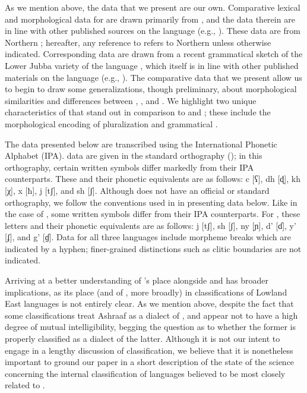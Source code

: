 \documentclass[output=paper]{LSP/langsci}
\begin{document}
 As we mention above, the  data that we present are our own. Comparative lexical and morphological data for  are drawn primarily from \citet{Greenetal2015}, and the data therein are in line with other published sources on the language (e.g., \citealt{Bell1953,Saeed1999}). These data are from Northern ; hereafter, any reference to  refers to Northern  unless otherwise indicated. Corresponding  data are drawn from a recent grammatical sketch of the Lower Jubba variety of the language \citet{PasterRanero2015}, which itself is in line with other published materials on the language (e.g., \citealt{Paster2007,Paster2010,PasterMaayGender}). The comparative data that we present allow us to begin to draw some generalizations, though preliminary, about morphological similarities and differences between , , and . We highlight two unique characteristics of  that stand out in comparison to  and ; these include the morphological encoding of pluralization and grammatical . 
 
 The  data presented below are transcribed using the International Phonetic Alphabet (IPA).  data are given in the standard  orthography (\citealt{Andrzejewski1978}); in this orthography, certain written symbols differ markedly from their IPA counterparts. These and their phonetic equivalents are as follows: c [ʕ], dh [ɖ], kh [χ], x [ħ], j [tʃ], and sh [ʃ]. Although  does not have an official or standard orthography, we follow the conventions used in \citet{PasterRanero2015} in presenting
 data below. Like in the case of , some  written symbols differ from their IPA counterparts. For , these letters and their phonetic equivalents are as follows: j [tʃ], sh [ʃ], ny [ɲ], d' [ɗ], y' [ʄ], and g' [ɠ]. Data for all three languages include morpheme breaks which are indicated by a hyphen; finer-grained distinctions such as clitic boundaries are not indicated. 
 
 Arriving at a better understanding of 's place alongside  and  has broader implications, as its place (and of , more broadly) in classifications of Lowland East  languages is not entirely clear. As we mention above, despite the fact that some classifications treat Ashraaf as a dialect of ,  and  appear not to have a high degree of mutual intelligibility, begging the question as to whether the former is properly classified as a dialect of the latter. Although it is not our intent to engage in a lengthy discussion of classification, we believe that it is nonetheless important to ground our paper in a short description of the state of the science concerning the internal classification of languages believed to be most closely related to . 
 
\end{document}
